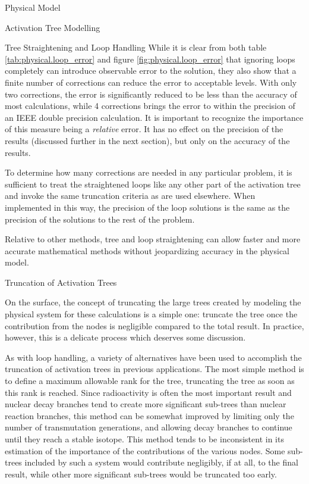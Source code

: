 \begin{chapter}{Physical Model\label{chap:physical}}
\begin{section}{Activation Tree Modelling\label{sec:physical.chains}}
\begin{subsection}{Tree Straightening and Loop Handling}
    While it is clear from both table \ref{tab:physical.loop_error}
    and figure \ref{fig:physical.loop_error} that ignoring loops
    completely can introduce observable error to the solution, they
    also show that a finite number of corrections can reduce the error
    to acceptable levels.  With only two corrections, the error is
    significantly reduced to be less than the accuracy of most
    calculations, while 4 corrections brings the error to within the
    precision of an IEEE double precision calculation.  It is
    important to recognize the importance of this measure being a
    \textsl{relative} error.  It has no effect on the precision of the
    results (discussed further in the next section), but only on the
    accuracy of the results.
    
    To determine how many corrections are needed in any particular
    problem, it is sufficient to treat the straightened loops like any
    other part of the activation tree and invoke the same truncation
    criteria as are used elsewhere.  When implemented in this way, the
    precision of the loop solutions is the same as the precision of
    the solutions to the rest of the problem.
    
    Relative to other methods, tree and loop straightening can allow
    faster and more accurate mathematical methods without jeopardizing
    accuracy in the physical model.
  \end{subsection}

  \begin{subsection}{Truncation of Activation Trees}
    
    On the surface, the concept of truncating the large trees created
    by modeling the physical system for these calculations is a simple
    one: truncate the tree once the contribution from the nodes is
    negligible compared to the total result.  In practice, however,
    this is a delicate process which deserves some discussion.
    
    As with loop handling, a variety of alternatives have been used to
    accomplish the truncation of activation trees in previous
    applications.  The most simple method is to define a maximum
    allowable rank for the tree, truncating the tree as soon as this
    rank is reached.  Since radioactivity is often the most important
    result and nuclear decay branches tend to create more significant
    sub-trees than nuclear reaction branches, this method can be
    somewhat improved by limiting only the number of transmutation
    generations, and allowing decay branches to continue until they
    reach a stable isotope.  This method tends to be inconsistent in
    its estimation of the importance of the contributions of the
    various nodes.  Some sub-trees included by such a system would
    contribute negligibly, if at all, to the final result, while other
    more significant sub-trees would be truncated too early.
    

\end{subsection}
\end{section}
\end{chapter}
